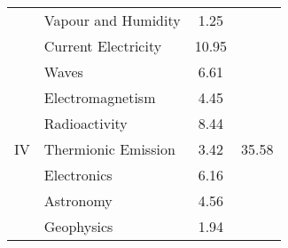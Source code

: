 \begin{center}
\begin{longtable}{|c|l|c|c|}
						& Vapour and Humidity					& 1.25 & 					\\ \cline{2-3}
						& Current Electricity 						& 10.95 & 					\\ \hline
		\multirow{7}{*}{IV}	& Waves								& 6.61 & \multirow{7}{*}{35.58}	\\ \cline{2-3}
						& Electromagnetism						& 4.45 & 					\\ \cline{2-3}
						& Radioactivity							& 8.44 & 					\\ \cline{2-3}
						& Thermionic Emission					& 3.42 & 					\\ \cline{2-3}
						& Electronics							& 6.16 & 					\\ \cline{2-3}
						& Astronomy							& 4.56 & 					\\ \cline{2-3}
						& Geophysics							& 1.94 & 					\\ \hline
	\end{longtable}
\end{center}

